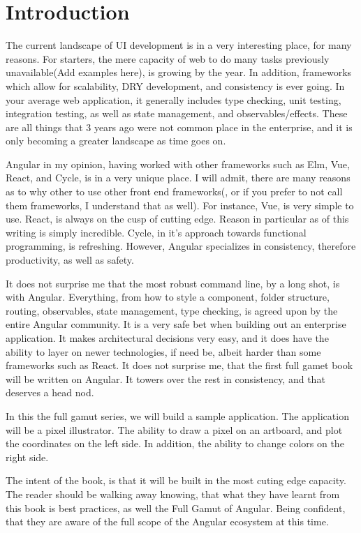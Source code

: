 \maketitle{}
\section{Introduction}

The current landscape of UI development is in a very interesting place, for many
reasons. For starters, the mere capacity of web to do many tasks previously
unavailable(Add examples here), is growing by the year. In addition, frameworks
which allow for scalability, DRY development, and consistency is ever going. In
your average web application, it generally includes type checking, unit testing,
integration testing, as well as state management, and observables/effects. These
are all things that 3 years ago were not common place in the enterprise, and it
is only becoming a greater landscape as time goes on.

Angular in my opinion, having worked with other frameworks such as Elm, Vue,
React, and Cycle, is in a very unique place. I will admit, there are many
reasons as to why other to use other front end frameworks(, or if you prefer to
not call them frameworks, I understand that as well). For instance, Vue, is very
simple to use. React, is always on the cusp of cutting edge. Reason in
particular as of this writing is simply incredible. Cycle, in it's approach
towards functional programming, is refreshing. However, Angular specializes in
consistency, therefore productivity, as well as safety.

It does not surprise me that the most robust command line, by a long shot, is
with Angular. Everything, from how to style a component, folder structure,
routing, observables, state management, type checking, is agreed upon by the
entire Angular community. It is a very safe bet when building out an enterprise
application. It makes architectural decisions very easy, and it does have the
ability to layer on newer technologies, if need be, albeit harder than some
frameworks such as React. It does not surprise me, that the first full gamet
book will be written on Angular. It towers over the rest in consistency, and
that deserves a head nod.

In this the full gamut series, we will build a sample application. The
application will be a pixel illustrator. The ability to draw a pixel on an
artboard, and plot the coordinates on the left side. In addition, the ability to
change colors on the right side.

The intent of the book, is that it will be built in the most cuting edge
capacity. The reader should be walking away knowing, that what they have learnt
from this book is best practices, as well the Full Gamut of Angular. Being
confident, that they are aware of the full scope of the Angular ecosystem at
this time.
